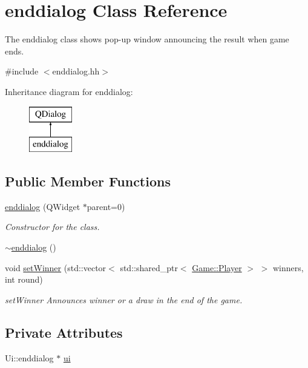 \hypertarget{classenddialog}{\section{enddialog Class Reference}
\label{classenddialog}
}


The enddialog class shows pop-\/up window announcing the result when game ends.  




{\ttfamily \#include $<$enddialog.\-hh$>$}

Inheritance diagram for enddialog\-:\begin{figure}[H]
\begin{center}
\leavevmode
\includegraphics[height=2.000000cm]{classenddialog}
\end{center}
\end{figure}
\subsection*{Public Member Functions}
\begin{DoxyCompactItemize}
\item 
\hyperlink{classenddialog_a5dcbc64678b43043e16f74bd4c4dffb0}{enddialog} (Q\-Widget $\ast$parent=0)
\begin{DoxyCompactList}\small\item\em Constructor for the class. \end{DoxyCompactList}\item 
\hyperlink{classenddialog_acff9c0eadb5978bceef8d3d4dec5bfcc}{$\sim$enddialog} ()
\item 
void \hyperlink{classenddialog_a987154e1c5b99b8c1caf4b9ee0e39c8a}{set\-Winner} (std\-::vector$<$ std\-::shared\-\_\-ptr$<$ \hyperlink{classGame_1_1Player}{Game\-::\-Player} $>$ $>$ winners, int round)
\begin{DoxyCompactList}\small\item\em set\-Winner Announces winner or a draw in the end of the game. \end{DoxyCompactList}\end{DoxyCompactItemize}
\subsection*{Private Attributes}
\begin{DoxyCompactItemize}
\item 
Ui\-::enddialog $\ast$ \hyperlink{classenddialog_afa3bb8811c3ff8cbf6bb1fa27057fadc}{ui}
\end{DoxyCompactItemize}


